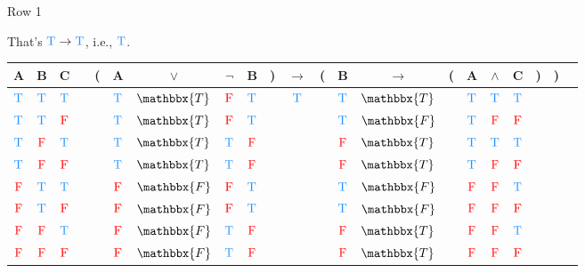 \documentclass[
  ignorenonframetext,
]{beamer}
\renewcommand{\,}{\text{, }}
\def\True{\textcolor{dodgerblue}{\text{T}}}
\def\False{\textcolor{red}{\text{F}}}
\begin{document}
\begin{frame}{Row 1}
\protect\hypertarget{row-1-1}{}

That's \(\True \rightarrow \True\), i.e., \(\True\).

\begin{center}
\bigskip
\begin{tabular}{@{ }c@{ }@{ }c@{ }@{ }c | c@{ }@{}c@{}@{ }c@{ }@{ }c@{ }@{ }c@{ }@{ }c@{ }@{}c@{}@{ }c@{ }@{}c@{}@{ }c@{ }@{ }c@{ }@{}c@{}@{ }c@{ }@{ }c@{ }@{ }c@{ }@{}c@{}@{}c@{}@{ }c}
A & B & C &  & ( & A & $\vee$ & $\neg$ & B & ) & $\rightarrow$ & ( & B & $\rightarrow$ & ( & A & $\wedge$ & C & ) & ) & \\
\hline 
 $\True$ & $\True$ & $\True$ &  &  & $\True$ & $\mathbbx{T}$ & $\False$ & $\True$ &  &\textcolor{red}{$\True$}&  & $\True$ & $\mathbbx{T}$ &  & $\True$ & $\True$ & $\True$ &  &  & \\
 $\True$ & $\True$ & $\False$ &  &  & $\True$ & $\mathbbx{T}$ & $\False$ & $\True$ &  &&  & $\True$ & $\mathbbx{F}$ &  & $\True$ & $\False$ & $\False$ &  &  & \\
 $\True$ & $\False$ & $\True$ &  &  & $\True$ & $\mathbbx{T}$ & $\True$ & $\False$ &  &&  & $\False$ & $\mathbbx{T}$ &  & $\True$ & $\True$ & $\True$ &  &  & \\
 $\True$ & $\False$ & $\False$ &  &  & $\True$ & $\mathbbx{T}$ & $\True$ & $\False$ &  &&  & $\False$ & $\mathbbx{T}$ &  & $\True$ & $\False$ & $\False$ &  &  & \\
 $\False$ & $\True$ & $\True$ &  &  & $\False$ & $\mathbbx{F}$ & $\False$ & $\True$ &  &&  & $\True$ & $\mathbbx{F}$ &  & $\False$ & $\False$ & $\True$ &  &  & \\
 $\False$ & $\True$ & $\False$ &  &  & $\False$ & $\mathbbx{F}$ & $\False$ & $\True$ &  &&  & $\True$ & $\mathbbx{F}$ &  & $\False$ & $\False$ & $\False$ &  &  & \\
 $\False$ & $\False$ & $\True$ &  &  & $\False$ & $\mathbbx{F}$ & $\True$ & $\False$ &  &&  & $\False$ & $\mathbbx{T}$ &  & $\False$ & $\False$ & $\True$ &  &  & \\
 $\False$ & $\False$ & $\False$ &  &  & $\False$ & $\mathbbx{F}$ & $\True$ & $\False$ &  &&  & $\False$ & $\mathbbx{T}$ &  & $\False$ & $\False$ & $\False$ &  &  & \\
\end{tabular}
\bigskip
\end{center}

\end{frame}
\end{document}
